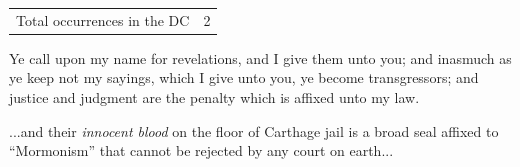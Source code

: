 		\begin{tabular}{ll}
			Total occurrences in the DC & 2
		\end{tabular}
		
		\begin{compactdesc}
			\item[{\hyperref[DC82-4]{DC 82:4}}] Ye call upon my name for revelations, and I give them unto you; and inasmuch as ye keep not my sayings, which I give unto you, ye become transgressors; and justice and judgment are the penalty which is affixed unto my law.
			\item[{\hyperref[DC135-7]{DC 135:7}}] ...and their \textit{innocent blood} on the floor of Carthage jail is a broad seal affixed to ``Mormonism'' that cannot be rejected by any court on earth...
		\end{compactdesc}
		
	
		
		

	

